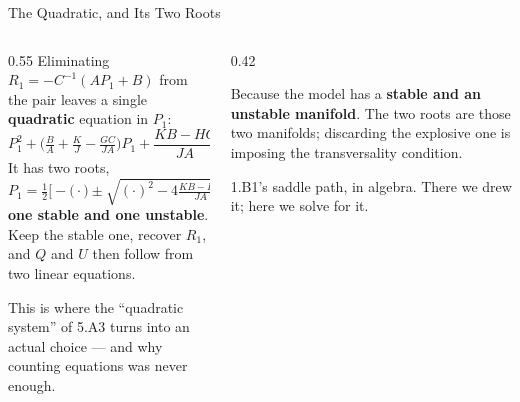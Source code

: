 \begin{frame}{The Quadratic, and Its Two Roots}
\begin{columns}[T]
\begin{column}{0.55\textwidth}
\small
Eliminating $R_1=-C^{-1}(AP_1+B)$ from the pair leaves a single \textbf{quadratic} equation in $P_1$:
\[
  P_1^{2}+\Big(\tfrac{B}{A}+\tfrac{K}{J}-\tfrac{GC}{JA}\Big)P_1
  +\frac{KB-HC}{JA}=0 .
\]
It has two roots,
\[
  P_1=\tfrac12\Big[-\big(\cdot\big)\pm\sqrt{(\cdot)^2-4\tfrac{KB-HC}{JA}}\Big],
\]
\textbf{one stable and one unstable}. Keep the stable one, recover $R_1$, and $Q$ and $U$ then follow from two linear equations.
\medskip

This is where the ``quadratic system'' of 5.A3 turns into an actual choice --- and why counting equations was never enough.
\end{column}
\begin{column}{0.42\textwidth}
\begin{conceptbox}[title=\textbf{Why quadratic at all?}]\small
Because the model has a \textbf{stable and an unstable manifold}. The two roots are those two manifolds; discarding the explosive one is imposing the transversality condition.
\end{conceptbox}
\medskip
\begin{examplebox}\footnotesize
1.B1's saddle path, in algebra. There we drew it; here we solve for it.
\end{examplebox}
\end{column}
\end{columns}
\vspace{1mm}
\end{frame}

